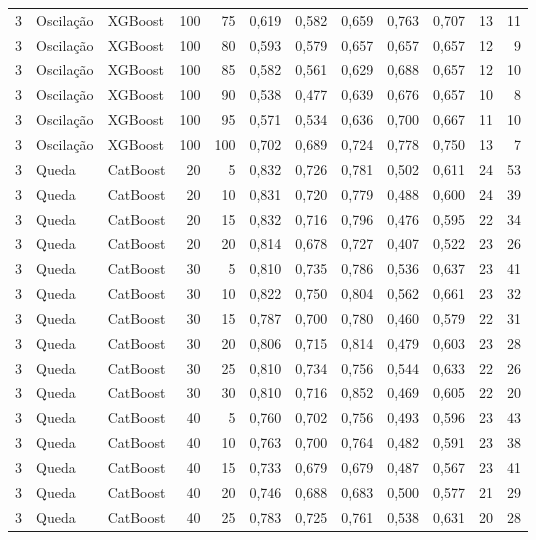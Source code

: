 \begin{longtable}{@{}rllrrrrrrrrr@{}}
3 & Oscilação & XGBoost & 100 & 75 & 0,619 & 0,582 & 0,659 & 0,763 & 0,707 & 13 & 11 \\
3 & Oscilação & XGBoost & 100 & 80 & 0,593 & 0,579 & 0,657 & 0,657 & 0,657 & 12 & 9 \\
3 & Oscilação & XGBoost & 100 & 85 & 0,582 & 0,561 & 0,629 & 0,688 & 0,657 & 12 & 10 \\
3 & Oscilação & XGBoost & 100 & 90 & 0,538 & 0,477 & 0,639 & 0,676 & 0,657 & 10 & 8 \\
3 & Oscilação & XGBoost & 100 & 95 & 0,571 & 0,534 & 0,636 & 0,700 & 0,667 & 11 & 10 \\
3 & Oscilação & XGBoost & 100 & 100 & 0,702 & 0,689 & 0,724 & 0,778 & 0,750 & 13 & 7 \\
3 & Queda & CatBoost & 20 & 5 & 0,832 & 0,726 & 0,781 & 0,502 & 0,611 & 24 & 53 \\
3 & Queda & CatBoost & 20 & 10 & 0,831 & 0,720 & 0,779 & 0,488 & 0,600 & 24 & 39 \\
3 & Queda & CatBoost & 20 & 15 & 0,832 & 0,716 & 0,796 & 0,476 & 0,595 & 22 & 34 \\
3 & Queda & CatBoost & 20 & 20 & 0,814 & 0,678 & 0,727 & 0,407 & 0,522 & 23 & 26 \\
3 & Queda & CatBoost & 30 & 5 & 0,810 & 0,735 & 0,786 & 0,536 & 0,637 & 23 & 41 \\
3 & Queda & CatBoost & 30 & 10 & 0,822 & 0,750 & 0,804 & 0,562 & 0,661 & 23 & 32 \\
3 & Queda & CatBoost & 30 & 15 & 0,787 & 0,700 & 0,780 & 0,460 & 0,579 & 22 & 31 \\
3 & Queda & CatBoost & 30 & 20 & 0,806 & 0,715 & 0,814 & 0,479 & 0,603 & 23 & 28 \\
3 & Queda & CatBoost & 30 & 25 & 0,810 & 0,734 & 0,756 & 0,544 & 0,633 & 22 & 26 \\
3 & Queda & CatBoost & 30 & 30 & 0,810 & 0,716 & 0,852 & 0,469 & 0,605 & 22 & 20 \\
3 & Queda & CatBoost & 40 & 5 & 0,760 & 0,702 & 0,756 & 0,493 & 0,596 & 23 & 43 \\
3 & Queda & CatBoost & 40 & 10 & 0,763 & 0,700 & 0,764 & 0,482 & 0,591 & 23 & 38 \\
3 & Queda & CatBoost & 40 & 15 & 0,733 & 0,679 & 0,679 & 0,487 & 0,567 & 23 & 41 \\
3 & Queda & CatBoost & 40 & 20 & 0,746 & 0,688 & 0,683 & 0,500 & 0,577 & 21 & 29 \\
3 & Queda & CatBoost & 40 & 25 & 0,783 & 0,725 & 0,761 & 0,538 & 0,631 & 20 & 28 \\

\end{longtable}

